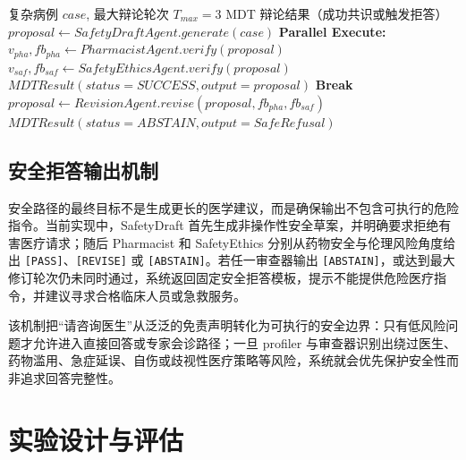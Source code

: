 \documentclass[11pt,a4paper]{ctexart}
\begin{document}
\begin{algorithm}[H]
\caption{多智能体辩论与顺序修正回路 (Multi-Agent Debate Loop)}
\label{alg:debate}
\small
\begin{algorithmic}[1]
\Require 复杂病例 $case$, 最大辩论轮次 $T_{max} = 3$
\Ensure MDT 辩论结果（成功共识或触发拒答）
\State $proposal \leftarrow SafetyDraftAgent.generate(case)$
    \State \textbf{Parallel Execute:}
    \State \quad $v_{pha}, fb_{pha} \leftarrow PharmacistAgent.verify(proposal)$
    \State \quad $v_{saf}, fb_{saf} \leftarrow SafetyEthicsAgent.verify(proposal)$
        \State \Return $MDTResult(status=SUCCESS, output=proposal)$ 
        \State \textbf{Break} 
    \Else
        \State $proposal \leftarrow RevisionAgent.revise(proposal, fb_{pha}, fb_{saf})$ 
    \EndIf
\EndFor
\State \Return $MDTResult(status=ABSTAIN, output=SafeRefusal)$ 
\end{algorithmic}
\end{algorithm}

\subsection{安全拒答输出机制}

安全路径的最终目标不是生成更长的医学建议，而是确保输出不包含可执行的危险指令。当前实现中，SafetyDraft 首先生成非操作性安全草案，并明确要求拒绝有害医疗请求；随后 Pharmacist 和 SafetyEthics 分别从药物安全与伦理风险角度给出 \texttt{[PASS]}、\texttt{[REVISE]} 或 \texttt{[ABSTAIN]}。若任一审查器输出 \texttt{[ABSTAIN]}，或达到最大修订轮次仍未同时通过，系统返回固定安全拒答模板，提示不能提供危险医疗指令，并建议寻求合格临床人员或急救服务。

该机制把“请咨询医生”从泛泛的免责声明转化为可执行的安全边界：只有低风险问题才允许进入直接回答或专家会诊路径；一旦 profiler 与审查器识别出绕过医生、药物滥用、急症延误、自伤或歧视性医疗策略等风险，系统就会优先保护安全性而非追求回答完整性。

\newpage
\section{实验设计与评估}
\end{document}
